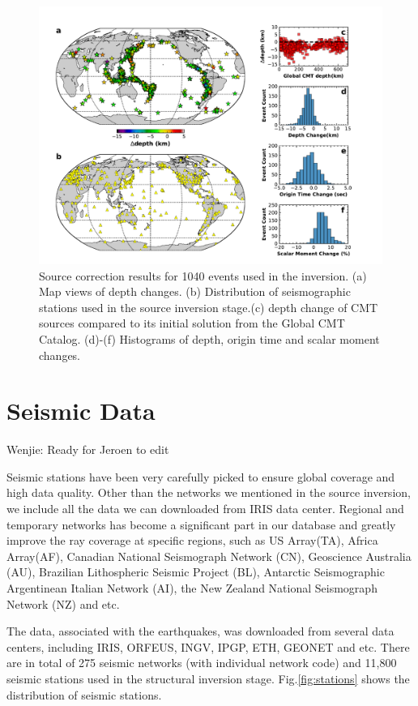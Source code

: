 \documentclass[extra,mreferee]{gji}
\begin{document}
\begin{figure}
  \centering
  \includegraphics[width=\textwidth]{figures/source_corrections.pdf}
  \caption{Source correction results for 1040 events used in the inversion. (a) Map views of depth changes. (b) Distribution of seismographic stations used in the source inversion stage.(c) depth change of CMT sources compared to its initial solution from the Global CMT Catalog. (d)-(f) Histograms of depth, origin time and scalar moment changes.}
  \label{fig:source_correction}
\end{figure}

\section{Seismic Data}

{\color{Red} Wenjie: Ready for Jeroen to edit}

Seismic stations have been very carefully picked to ensure global coverage and high data quality.
Other than the networks we mentioned in the source inversion, we include all the data we can
downloaded from IRIS data center. Regional and temporary networks has become a significant part
in our database and greatly improve the ray coverage at specific regions, such as US Array(TA),
Africa Array(AF), Canadian National Seismograph Network (CN), Geoscience Australia (AU),
Brazilian Lithospheric Seismic Project (BL),
Antarctic Seismographic Argentinean Italian Network (AI),
the New Zealand National Seismograph Network (NZ) and etc.

The data, associated with the earthquakes, was downloaded from several data centers,
including IRIS, ORFEUS, INGV, IPGP, ETH, GEONET and etc.
There are in total of 275 seismic networks (with individual network code) and 11,800
seismic stations used in the structural inversion stage. Fig.\ref{fig:stations}
shows the distribution of seismic stations.
\end{document}
